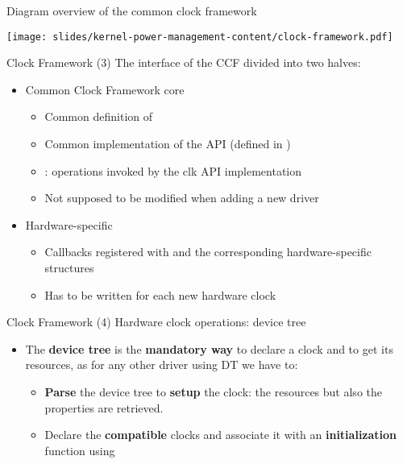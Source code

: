 \begin{frame}{Diagram overview of the common clock framework}
  \begin{center}
    \texttt{[image: slides/kernel-power-management-content/clock-framework.pdf]}
\end{center}
\end{frame}

\begin{frame}{Clock Framework (3)}
  The interface of the  CCF divided into two halves:
  \begin{itemize}
  \item Common Clock Framework core
    \begin{itemize}
    \item Common definition of 
    \item Common implementation of the  API (defined in
      )
    \item {}: operations invoked by the clk API
      implementation
    \item Not supposed to be modified when adding a new driver
    \end{itemize}
  \item Hardware-specific
    \begin{itemize}
    \item Callbacks registered with  and the
      corresponding hardware-specific structures
    \item Has to be written for each new hardware clock
    \end{itemize}
  \end{itemize}
\end{frame}

\begin{frame}{Clock Framework (4)}
  Hardware clock operations: device tree
  \begin{itemize}
  \item The \textbf{device tree} is the \textbf{mandatory way} to
    declare a clock and to get its resources, as for any other
    driver using DT we have to:
    \begin{itemize}
    \item \textbf{Parse} the device tree to \textbf{setup} the
      clock: the resources but also the properties are retrieved.
    \item Declare the \textbf{compatible} clocks and associate it
      with an \textbf{initialization} function using
    \end{itemize}
  \end{itemize}
\end{frame}

